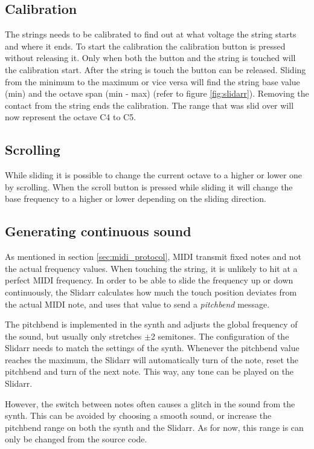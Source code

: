 \documentclass{article}
\begin{document}
\subsection{Calibration}
The strings needs to be calibrated to find out at what voltage the string starts and where it ends. To start the calibration the calibration button is pressed without releasing it. Only when both the button and the string is touched will the calibration start. After the string is touch the button can be released. Sliding from the minimum to the maximum or vice versa will find the string base value (min) and the octave span (min - max) (refer to figure \ref{fig:slidarr}). Removing the contact from the string ends the calibration. The range that was slid over will now represent the octave C4 to C5.

\subsection{Scrolling}
While sliding it is possible to change the current octave to a higher or lower one by scrolling. When the scroll button is pressed while sliding it will change the base frequency to a higher or lower depending on the sliding direction.

\subsection{Generating continuous sound}
As mentioned in section \ref{sec:midi_protocol}, MIDI transmit fixed notes and not the actual frequency values. When touching the string, it is unlikely to hit at a perfect MIDI frequency. In order to be able to slide the frequency up or down continuously, the Slidarr calculates how much the touch position deviates from the actual MIDI note, and uses that value to send a \textit{pitchbend} message. 

The pitchbend is implemented in the synth and adjusts the global frequency of the sound, but usually only stretches $\pm$2 semitones. The configuration of the Slidarr needs to match the settings of the synth. Whenever the pitchbend value reaches the maximum, the Slidarr will automatically turn of the note, reset the pitchbend and turn of the next note. This way, any tone can be played on the Slidarr.

However, the switch between notes often causes a glitch in the sound from the synth. This can be avoided by choosing a smooth sound, or increase the pitchbend range on both the synth and the Slidarr. As for now, this range is can only be changed from the source code.
\end{document}

